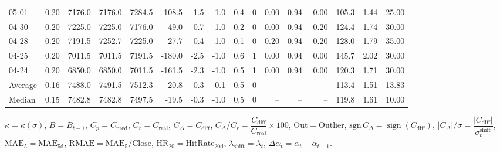 \begin{threeparttable}
{\begin{tabular}{lrrrrrrrrrrrrrrr}
  05-01 &     0.20 & 7176.0 & 7176.0 & 7284.5 &     -108.5 &           -1.5 &                     -1.0 &                 0.4 &              0 &       0.00 &      0.94 &           0.00 &            105.3 &            1.44 &                  25.00 \\
  04-30 &     0.20 & 7225.0 & 7225.0 & 7176.0 &       49.0 &            0.7 &                      1.0 &                 0.2 &              0 &       0.00 &      0.94 &          -0.20 &            124.4 &            1.74 &                  30.00 \\
  04-28 &     0.20 & 7191.5 & 7252.7 & 7225.0 &       27.7 &            0.4 &                      1.0 &                 0.1 &              0 &       0.20 &      0.94 &           0.20 &            128.0 &            1.79 &                  35.00 \\
  04-25 &     0.20 & 7011.5 & 7011.5 & 7191.5 &     -180.0 &           -2.5 &                     -1.0 &                 0.6 &              1 &       0.00 &      0.94 &           0.00 &            145.7 &            2.02 &                  30.00 \\
  04-24 &     0.20 & 6850.0 & 6850.0 & 7011.5 &     -161.5 &           -2.3 &                     -1.0 &                 0.5 &              1 &       0.00 &      0.94 &           0.00 &            120.3 &            1.71 &                  30.00 \\
Average &     0.16 & 7488.0 & 7491.5 & 7512.3 &      -20.8 &           -0.3 &                     -0.1 &                 0.5 &              0 &         -- &        -- &             -- &            113.4 &            1.51 &                  13.83 \\
 Median &     0.15 & 7482.8 & 7482.8 & 7497.5 &      -19.5 &           -0.3 &                     -1.0 &                 0.5 &              0 &         -- &        -- &             -- &            119.8 &            1.61 &                  10.00 \\
\bottomrule
\end{tabular}
}
\begin{tablenotes}\footnotesize
\item $\kappa=\kappa(\sigma)$, $B=B_{t-1}$, $C_p=C_{\text{pred}}$, $C_r=C_{\text{real}}$, $C_\Delta=C_{\text{diff}}$, $C_\Delta/C_r=\dfrac{C_{\text{diff}}}{C_{\text{real}}}\times100$, $\mathrm{Out}=\text{Outlier}$, $\mathrm{sgn}\,C_\Delta=\operatorname{sign}(C_{\text{diff}})$, $|C_\Delta|/\sigma=\dfrac{|C_{\text{diff}}|}{\sigma_t^{\text{shift}}}$, $\mathrm{MAE}_5=\mathrm{MAE}_{5\text{d}}$, $\mathrm{RMAE}= \mathrm{MAE}_5 / \text{Close}$, $\mathrm{HR}_{20}=\mathrm{HitRate}_{20\text{d}}$, 
$\lambda_{\text{shift}}=\lambda_t$, 
$\Delta\alpha_t=\alpha_t-\alpha_{t-1}$.
\end{tablenotes}
\end{threeparttable}
\endgroup

